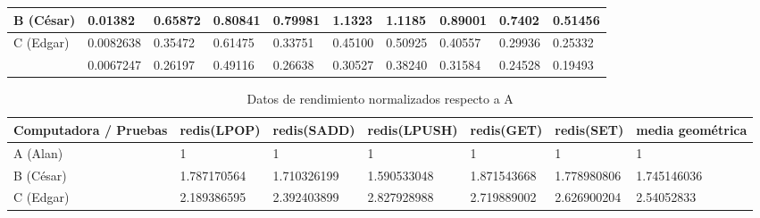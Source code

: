 \documentclass{article}
\begin{document}
\begin{enumerate}
{\begin{table}[H]
\begin{tabular}{|l|l|l|l|l|l|l|l|l|l|}
                \cellcolor[HTML]{FFFE65}{\color[HTML]{000000}}
                B (César) & 0.01382 & 0.65872 & 0.80841 & 0.79981 & 1.1323 
                & 1.1185 & 0.89001 & 0.7402 & 0.51456 \\ \hline
    
                
    
                \cellcolor[HTML]{34FF34}{\color[HTML]{000000}}
                C (Edgar) & 0.0082638 & 0.35472 & 0.61475 & 0.33751 & 0.45100 
                & 0.50925 & 0.40557 & 0.29936 & 0.25332\\ \hline
    
                
    
                \cellcolor[HTML]{9698ED}{\color[HTML]{000000} 
                D(Sandra)} & 0.0067247 & 0.26197 & 0.49116 & 0.26638 & 0.30527 
                & 0.38240 & 0.31584 & 0.24528 & 0.19493 \\ \hline
    
                
                \end{tabular}
            \end{table}
    
            \begin{table}[H]
                \caption*{Datos de rendimiento normalizados respecto a A}
                \begin{tabular}{|l|l|l|l|l|l|l|}
                \toprule
                    Computadora / Pruebas
                    & \cellcolor[HTML]{DAE8FC}redis(LPOP) 
                    & \cellcolor[HTML]{DAE8FC}redis(SADD) 
                    & \cellcolor[HTML]{DAE8FC}redis(LPUSH) 
                    & \cellcolor[HTML]{DAE8FC}redis(GET)
                    & \cellcolor[HTML]{DAE8FC}redis(SET) 
                    & \cellcolor[HTML]{DAE8FC}media geométrica \\ \hline
    
                    \cellcolor[HTML]{F8A102}{\color[HTML]{000000}} 
                    A (Alan) & 1 & 1 & 1 & 1 & 1 & 1 \\ \hline
    
                    \cellcolor[HTML]{FFFE65}{\color[HTML]{000000}}
                    B (César) & 1.787170564 & 1.710326199 & 1.590533048 
                    & 1.871543668 & 1.778980806 & 1.745146036\\ \hline
    
    
                    \cellcolor[HTML]{34FF34}{\color[HTML]{000000}} 
                    C (Edgar) & 2.189386595 & 2.392403899 & 2.827928988 
                    & 2.719889002 & 2.626900204 & 2.54052833\\ \hline
    

\end{tabular}
\end{table}}
\end{enumerate}
\end{document}
